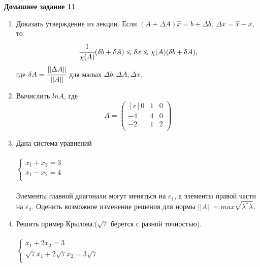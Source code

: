 \documentclass[12pt]{article}
\theoremstyle{definition}
\numberwithin{equation}{section}
\begin{document}
	\textbf{Домашнее задание 11}\begin{enumerate}
		\item Доказать утверждение из лекции. Если $(A+\Delta A)\hat x=b+\Delta b,~\Delta x=\hat x-x$, то 
		$$\cfrac{1}{\chi(A)}(\delta b+\delta A) \leqslant \delta x \leqslant \chi(A)(\delta b+ \delta A),$$ где $\delta A=\cfrac{||\Delta A||}{||A||}$ для малых $\Delta b, \Delta A, \Delta x$.
		\item Вычислить $ln A$, где 
		\[A = \begin{pmatrix}[r]
		0 & 1 & 0\\
		-4 & 4 & 0\\
		-2 & 1 & 2\\
		\end{pmatrix}\]
		\item Дана система уравнений\\ \\
		$
		\left\{
		\begin{array}{lcl}
		x_1+x_2=3\\
		x_1-x_2=4\\
		\end{array}
		\right.
		$
		\\ \\
		Элементы главной диагонали могут меняться на $\varepsilon_1$, а элементы правой части на $\varepsilon_2$. Оценить возможное изменение решения для нормы $||A||=max\sqrt{\lambda^*\lambda}$.
		\item Решить пример Крылова.($\sqrt{7}$ берется с разной точностью).\\ \\
		$
		\left\{
		\begin{array}{lcl}
		x_1+2x_2=3\\
		\sqrt{7}x_1+2\sqrt{7}x_2=3\sqrt{7}\\
		\end{array}
		\right.
		$
		\\ 
	\end{enumerate}
	~\\
\end{document}
